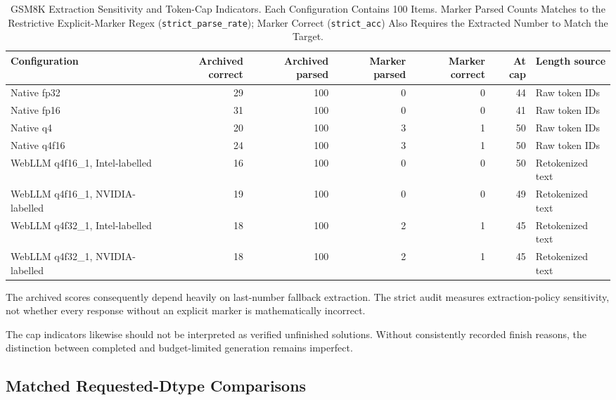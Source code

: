 \documentclass[conference]{IEEEtran}
\begin{document}
\begin{table}[t]
\caption{
GSM8K Extraction Sensitivity and Token-Cap Indicators.
Each Configuration Contains 100 Items.
Marker Parsed Counts Matches to the Restrictive Explicit-Marker
Regex (\texttt{strict\_parse\_rate}); Marker Correct
(\texttt{strict\_acc}) Also Requires the Extracted Number to
Match the Target.
}
\label{tab:gsmparsing}
\centering
\footnotesize
\setlength{\tabcolsep}{5pt}
\begin{tabular}{@{}lrrrrrl@{}}
\toprule
Configuration &
Archived correct &
Archived parsed &
Marker parsed &
Marker correct &
At cap &
Length source\\
\midrule
Native fp32 &
29 & 100 & 0 & 0 & 44 &
Raw token IDs\\

Native fp16 &
31 & 100 & 0 & 0 & 41 &
Raw token IDs\\

Native q4 &
20 & 100 & 3 & 1 & 50 &
Raw token IDs\\

Native q4f16 &
24 & 100 & 3 & 1 & 50 &
Raw token IDs\\

WebLLM q4f16\_1, Intel-labelled &
16 & 100 & 0 & 0 & 50 &
Retokenized text\\

WebLLM q4f16\_1, NVIDIA-labelled &
19 & 100 & 0 & 0 & 49 &
Retokenized text\\

WebLLM q4f32\_1, Intel-labelled &
18 & 100 & 2 & 1 & 45 &
Retokenized text\\

WebLLM q4f32\_1, NVIDIA-labelled &
18 & 100 & 2 & 1 & 45 &
Retokenized text\\
\bottomrule
\end{tabular}
\end{table}

The archived scores consequently depend heavily on
last-number fallback extraction.
The strict audit measures extraction-policy sensitivity,
not whether every response without an explicit marker is
mathematically incorrect.

The cap indicators likewise should not be interpreted as
verified unfinished solutions.
Without consistently recorded finish reasons, the
distinction between completed and budget-limited generation
remains imperfect.


\subsection{Matched Requested-Dtype Comparisons}
\label{sec:matched}
\end{document}
